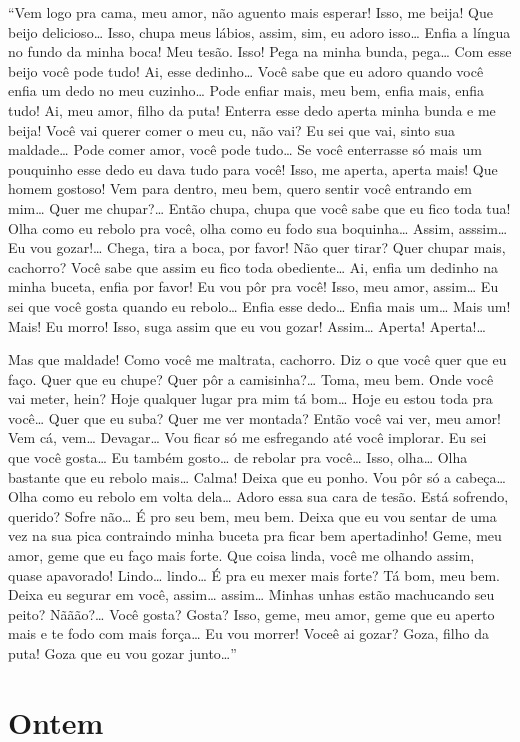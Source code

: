``Vem logo pra cama, meu amor, não aguento mais esperar! Isso, me beija!
Que beijo delicioso… Isso, chupa meus lábios, assim, sim, eu
adoro isso… Enfia a língua no fundo da minha boca! Meu tesão.
Isso! Pega na minha bunda, pega… Com esse beijo você pode tudo!
Ai, esse dedinho… Você sabe que eu adoro quando você enfia um
dedo no meu cuzinho… Pode enfiar mais, meu bem, enfia mais, enfia
tudo! Ai, meu amor, filho da puta! Enterra esse dedo aperta minha
bunda e me beija! Você vai querer comer o meu cu, não vai? Eu sei que
vai, sinto sua maldade… Pode comer amor, você pode tudo…
Se você enterrasse só mais um pouquinho esse dedo eu dava tudo para
você! Isso, me aperta, aperta mais! Que homem gostoso! Vem para dentro,
meu bem, quero sentir você entrando em mim… Quer me
chupar?… Então chupa, chupa que você sabe que eu fico toda tua!
Olha como eu rebolo pra você, olha como eu fodo sua boquinha…
Assim, asssim… Eu vou gozar!… Chega, tira a boca, por
favor! Não quer tirar? Quer chupar mais, cachorro? Você sabe que assim eu
fico toda obediente… Ai, enfia um dedinho na minha buceta, enfia
por favor! Eu vou pôr pra você! Isso, meu amor, assim… Eu sei que
você gosta quando eu rebolo… Enfia esse dedo… Enfia mais
um… Mais um! Mais! Eu morro! Isso, suga assim que eu vou gozar!
Assim… Aperta! Aperta!…

Mas que maldade! Como você me maltrata, cachorro. Diz o que você quer que
eu faço. Quer que eu chupe? Quer pôr a camisinha?… Toma, meu bem.
Onde você vai meter, hein? Hoje qualquer lugar pra mim tá bom…
Hoje eu estou toda pra você… Quer que eu suba? Quer me ver
montada? Então você vai ver, meu amor! Vem cá, vem…
Devagar… Vou ficar só me esfregando até você implorar. Eu sei que
você gosta… Eu também gosto… de rebolar pra você…
Isso, olha… Olha bastante que eu rebolo mais… Calma! Deixa
que eu ponho. Vou pôr só a cabeça… Olha como eu rebolo em volta
dela… Adoro essa sua cara de tesão. Está sofrendo, querido? Sofre
não… É pro seu bem, meu bem. Deixa que eu vou sentar de uma vez
na sua pica contraindo minha buceta pra ficar bem apertadinho! Geme, meu
amor, geme que eu faço mais forte. Que coisa linda, você me olhando
assim, quase apavorado! Lindo… lindo… É pra eu mexer mais
forte? Tá bom, meu bem. Deixa eu segurar em você, assim…
assim… Minhas unhas estão machucando seu peito? Nããão?…
Você gosta? Gosta? Isso, geme, meu amor, geme que eu aperto mais e te
fodo com mais força… Eu vou morrer! Voceê ai gozar? Goza, filho
da puta! Goza que eu vou gozar junto…''

\chapter{Ontem}

